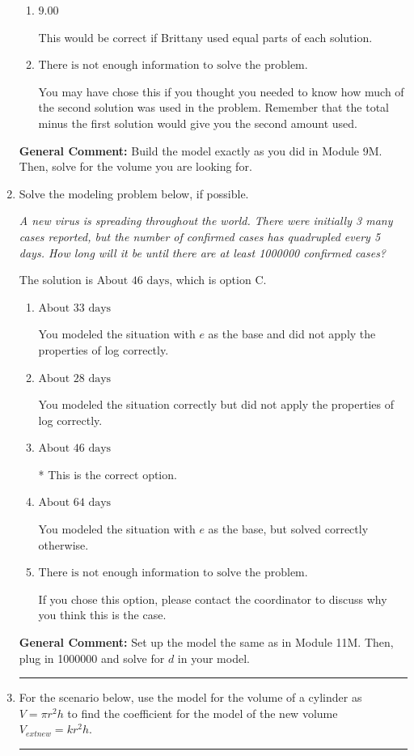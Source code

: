 \documentclass{extbook}[14pt]
\newcommand{\litem}[1]{\item #1

\rule{\textwidth}{0.4pt}}
\begin{document}
\begin{enumerate}
{\begin{enumerate}[label=\Alph*.]
This is the concentration of 37 percent solution.
\item \( 9.00 \)

This would be correct if Brittany used equal parts of each solution.
\item \( \text{There is not enough information to solve the problem.} \)

You may have chose this if you thought you needed to know how much of the second solution was used in the problem. Remember that the total minus the first solution would give you the second amount used.
\end{enumerate}

\textbf{General Comment:} Build the model exactly as you did in Module 9M. Then, solve for the volume you are looking for.
}
\litem{
Solve the modeling problem below, if possible.

\begin{center}
    \textit{ A new virus is spreading throughout the world. There were initially 3 many cases reported, but the number of confirmed cases has quadrupled every 5 days. How long will it be until there are at least 1000000 confirmed cases? }
\end{center}


The solution is \( \text{About } 46 \text{ days} \), which is option C.\begin{enumerate}[label=\Alph*.]
\item \( \text{About } 33 \text{ days} \)

You modeled the situation with $e$ as the base and did not apply the properties of log correctly.
\item \( \text{About } 28 \text{ days} \)

You modeled the situation correctly but did not apply the properties of log correctly.
\item \( \text{About } 46 \text{ days} \)

* This is the correct option.
\item \( \text{About } 64 \text{ days} \)

You modeled the situation with $e$ as the base, but solved correctly otherwise.
\item \( \text{There is not enough information to solve the problem.} \)

If you chose this option, please contact the coordinator to discuss why you think this is the case.
\end{enumerate}

\textbf{General Comment:} Set up the model the same as in Module 11M. Then, plug in 1000000 and solve for $d$ in your model.
}
\litem{
For the scenario below, use the model for the volume of a cylinder as $V = \pi r^2 h$ to find the coefficient for the model of the new volume $V_{	ext{new}} = k r^2 h$.

}
\end{enumerate}
\end{document}
